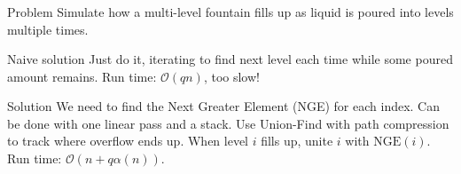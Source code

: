 \begin{frame}
    \frametitle{\problemtitle}
    \begin{block}{Problem}
        Simulate how a multi-level fountain fills up as liquid is poured into levels multiple times.
    \end{block}
    \pause
    \begin{block}{Naive solution}
        Just do it, iterating to find next level each time while some poured amount remains.
        Run time: $\mathcal O(qn)$, too slow!
    \end{block}
    \pause
    \begin{block}{Solution}
        We need to find the Next Greater Element (NGE) for each index.
        Can be done with one linear pass and a stack.
        Use Union-Find with path compression to track where overflow ends up.
        When level $i$ fills up, unite $i$ with $\mathrm{NGE}(i)$.
        Run time: $\mathcal O(n + q\alpha(n))$.
    \end{block}
    \pause
    \solvestats
\end{frame}

